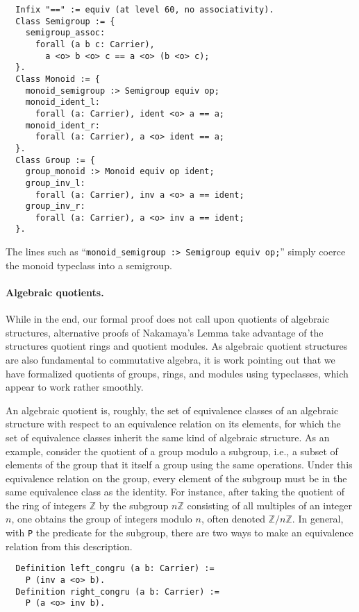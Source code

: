 \documentclass{article}
\begin{document}
\begin{verbatim}
  Infix "==" := equiv (at level 60, no associativity).
  Class Semigroup := {
    semigroup_assoc:
      forall (a b c: Carrier),
        a <o> b <o> c == a <o> (b <o> c);
  }.
  Class Monoid := {
    monoid_semigroup :> Semigroup equiv op;
    monoid_ident_l:
      forall (a: Carrier), ident <o> a == a;
    monoid_ident_r:
      forall (a: Carrier), a <o> ident == a;
  }.
  Class Group := {
    group_monoid :> Monoid equiv op ident;
    group_inv_l:
      forall (a: Carrier), inv a <o> a == ident;
    group_inv_r:
      forall (a: Carrier), a <o> inv a == ident;
  }.
\end{verbatim}
The lines such as  ``\verb|monoid_semigroup :> Semigroup equiv op;|'' simply coerce
the monoid typeclass into a semigroup.


\paragraph{Algebraic quotients.}
While in the end, our formal proof does not call upon quotients of
algebraic structures, alternative proofs of Nakamaya's Lemma take advantage of 
 the structures quotient rings and quotient modules.  As algebraic 
 quotient structures are also fundamental to commutative algebra,
it is work pointing out that we have formalized quotients of groups, rings, and modules 
  using typeclasses, which appear to work rather smoothly. 

An algebraic quotient is, roughly, the set of equivalence classes of an
algebraic structure with respect to an equivalence relation on its elements,
for which the set of equivalence classes inherit the same kind of algebraic
structure. 
As an example, consider the quotient of a group modulo a subgroup,
i.e., a subset of elements of the group that it itself a group using the same operations. 
Under this equivalence relation on the group, every element of the
subgroup must be in the same equivalence class as the identity. 
For instance, after taking the quotient of the ring of integers $\mathbb{Z}$ by the
subgroup $n \mathbb{Z}$ consisting of all multiples of an integer $n$, one obtains the
group of integers modulo $n$, often denoted $\mathbb{Z}/n\mathbb{Z}$.
In general, with \texttt{P}
the predicate for the subgroup, there are two ways to make an equivalence
relation from this description.

\begin{verbatim}
  Definition left_congru (a b: Carrier) :=
    P (inv a <o> b).
  Definition right_congru (a b: Carrier) :=
    P (a <o> inv b).
\end{verbatim}
\end{document}
